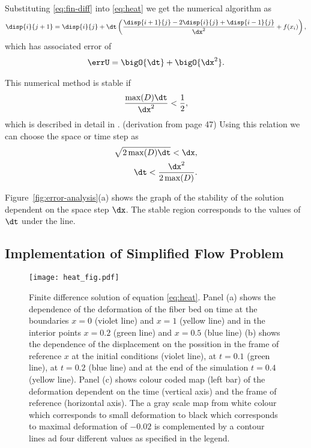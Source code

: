 \documentclass[twoside,a4paper,12pt]{article}
\newcommand{\figref}[1]{Figure~\ref{#1}}
\newcommand{\note}[1]{{\color{red}(#1)}}
\newcommand{\note}[1]{}
\begin{document}
Substituting \eqref{eq:fin-diff} into \eqref{eq:heat} we get the
numerical algorithm as
%
\begin{align}
\disp{i}{j+1}  =   \disp{i}{j} + \dt\left(\frac{\disp{i+1}{j} - 2\disp{i}{j} + \disp{i-1}{j}}{\dx^2}   + f(x_i) \right), \label{eq:findiff-alg}
\end{align}
%
which has associated error of
\begin{align}
  \errU =\bigO{\dt} + \bigO{\dx^2}.
\end{align}

This numerical method is stable if
\begin{align}
  \frac{\max(D)\dt}{\dx^2} < \frac{1}{2},
\end{align}
which is described in detail in \cite{Strikwerda2004}.
%
\note{derivation from page 47}
%
Using this relation we can choose the space or time step as
%
\begin{align}
  \sqrt{2\max(D)\dt} < \dx, \\
  \dt < \frac{\dx^2}{2\max(D)}.\label{eq:stable-boundary}
\end{align}

\figref{fig:error-analysis}(a) shows the graph of the stability of the
solution dependent on the space step $\dx$. The stable region
corresponds to the values of $\dt$ under the line.

\subsection{Implementation of Simplified Flow Problem}

\begin{figure}
  \centering
  \texttt{[image: heat\_fig.pdf]}
  \caption{Finite difference solution of equation
    \eqref{eq:heat}. Panel (a) shows the dependence of the deformation
    of the fiber bed on time at the boundaries $x=0$ (violet line) and
    $x=1$ (yellow line) and in the interior points $x=0.2$ (green
    line) and $x=0.5$ (blue line) (b) shows the dependence of the
    displacement on the possition in the frame of reference $x$ at the
    initial conditions (violet line), at $t=0.1$ (green line), at
    $t=0.2$ (blue line) and at the end of the simulation $t=0.4$
    (yellow line).  Panel (c) shows colour coded map (left bar) of the
    deformation dependent on the time (vertical axis) and the frame of
    reference (horizontal axis). The a gray scale map from white
    colour which corresponds to small deformation to black which
    corresponds to maximal deformation of $-0.02$ is complemented by a
    contour lines ad four different values as specified in the legend.}
  \label{fig:findiff-heat}
\end{figure}
\end{document}
